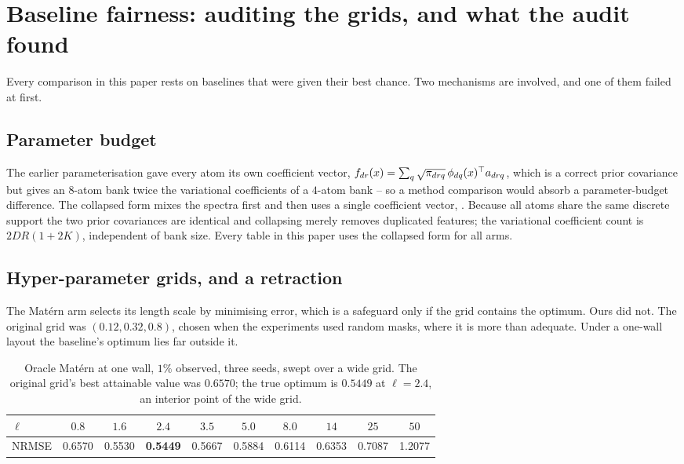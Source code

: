 \section{Baseline fairness: auditing the grids, and what the audit found}
\label{app:fairness}

Every comparison in this paper rests on baselines that were given their best
chance.  Two mechanisms are involved, and one of them failed at first.

\subsection{Parameter budget}
The earlier parameterisation gave every atom its own coefficient vector,
$f_{dr}(x) = \sum_q \sqrt{\pi_{drq}}\, \phi_{dq}(x)^\top a_{drq}$, which is a
correct prior covariance but gives an $8$-atom bank twice the variational
coefficients of a $4$-atom bank -- so a method comparison would absorb a
parameter-budget difference.  The collapsed form mixes the spectra first and then
uses a single coefficient vector, .  Because all atoms share
the same discrete support the two prior covariances are identical and collapsing
merely removes duplicated features; the variational coefficient count is
$2DR(1 + 2K)$, independent of bank size.  Every table in this paper uses the
collapsed form for all arms.

\subsection{Hyper-parameter grids, and a retraction}
The Mat\'ern arm selects its length scale by minimising error, which is a
safeguard only if the grid contains the optimum.  Ours did not.  The original
grid was $(0.12, 0.32, 0.8)$, chosen when the experiments used random masks,
where it is more than adequate.  Under a one-wall layout the baseline's optimum
lies far outside it.

\begin{table}[h]
  \centering
  \caption{Oracle Mat\'ern at one wall, $1\%$ observed, three seeds, swept over a
  wide grid.  The original grid's best attainable value was $0.6570$; the true
  optimum is $0.5449$ at $\ell = 2.4$, an interior point of the wide grid.}
  \label{tab:grid-audit}
  \small
  \begin{tabular}{lccccccccc}
    \toprule
    $\ell$ & $0.8$ & $1.6$ & $\mathbf{2.4}$ & $3.5$ & $5.0$ & $8.0$ & $14$ & $25$ & $50$ \\
    \midrule
    NRMSE & 0.6570 & 0.5530 & \textbf{0.5449} & 0.5667 & 0.5884 & 0.6114 & 0.6353 & 0.7087 & 1.2077 \\
    \bottomrule
  \end{tabular}
\end{table}

